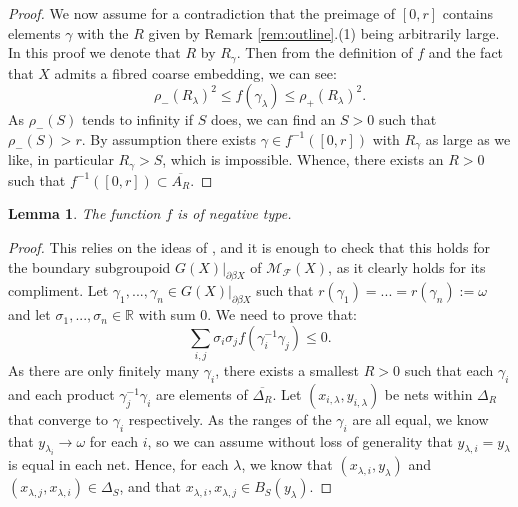 \documentclass[11pt]{amsart}
\theoremstyle{plain}
\newtheorem{lemma}[theorem]{Lemma}%
\theoremstyle{definition}%
\theoremstyle{remark}%
\begin{document}
{\begin{proof}
We now assume for a contradiction that the preimage of $[0,r]$ contains elements $\gamma$ with the $R$ given by Remark \ref{rem:outline}.(1) being arbitrarily large. In this proof we denote that $R$ by $R_{\gamma}$. Then from the definition of $f$ and the fact that $X$ admits a fibred coarse embedding, we can see:
\begin{equation*}
\rho_{-}(R_{\lambda})^{2} \leq f(\gamma_{\lambda}) \leq \rho_{+}(R_{\lambda})^{2}.
\end{equation*}
As $\rho_{-}(S)$ tends to infinity if $S$ does, we can find an $S>0$ such that $\rho_{-}(S)>r$. By assumption there exists $\gamma \in f^{-1}([0,r])$ with $R_{\gamma}$ as large as we like, in particular $R_{\gamma}>S$, which is impossible. Whence, there exists an $R>0$ such that $f^{-1}([0,r]) \subset \overline{A_{R}}$.
\end{proof}


\begin{lemma}\label{lem:MT1-b}
The function $f$ is of negative type.
\end{lemma}
\begin{proof}
This relies on the ideas of \cite[Theorem 5.4]{MR1905840}, and it is enough to check that this holds for the boundary subgroupoid $G(X)|_{\partial\beta X}$ of $\mathcal{M}_{\mathcal{F}}(X)$, as it clearly holds for its compliment. Let $\gamma_{1},...,\gamma_{n} \in G(X)|_{\partial\beta X}$ such that $r(\gamma_{1})=...=r(\gamma_{n}):=\omega$ and let $\sigma_{1},...,\sigma_{n} \in \mathbb{R}$ with sum $0$. We need to prove that:
\begin{equation*}
\sum_{i,j}\sigma_{i}\sigma_{j}f(\gamma_{i}^{-1}\gamma_{j}) \leq 0.
\end{equation*}
As there are only finitely many $\gamma_{i}$, there exists a smallest $R>0$ such that each $\gamma_{i}$ and each product $\gamma^{-1}_{j}\gamma_{i}$ are elements of $\overline{\Delta_{R}}$. Let $(x_{i,\lambda},y_{i,\lambda})$ be nets within $\Delta_{R}$ that converge to $\gamma_{i}$ respectively. As the ranges of the $\gamma_{i}$ are all equal, we know that $y_{\lambda_{i}}\rightarrow \omega$ for each $i$, so we can assume without loss of generality that $y_{\lambda,i}=y_{\lambda}$ is equal in each net. Hence, for each $\lambda$, we know that $(x_{\lambda,i},y_{\lambda})$ and $(x_{\lambda,j},x_{\lambda,i}) \in \Delta_{S}$, and that $x_{\lambda,i}, x_{\lambda,j}\in B_{S}(y_{\lambda})$.


\end{proof}}
\end{document}
